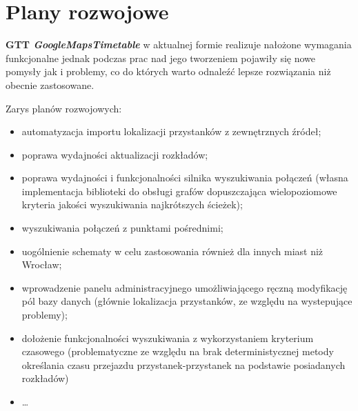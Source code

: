 \documentclass[a4paper,12pt]{article}
\begin{document}
\section{Plany rozwojowe} 

 \textbf{GTT \emph{GoogleMapsTimetable}} w aktualnej formie realizuje nałożone
 wymagania funkcjonalne jednak podczas prac nad jego tworzeniem pojawiły się
 nowe pomysły jak i problemy, co do których warto odnaleźć lepsze rozwiązania
 niż obecnie zastosowane.
 
 Zarys planów rozwojowych:
 
 \begin{itemize}
   \item automatyzacja importu lokalizacji przystanków z zewnętrznych źródeł;
   \item poprawa wydajności aktualizacji rozkładów;
   \item poprawa wydajności i funkcjonalności silnika wyszukiwania połączeń
   (własna implementacja biblioteki do obsługi grafów dopuszczająca
   wielopoziomowe kryteria jakości wyszukiwania najkrótszych ścieżek);
   \item wyszukiwania połączeń z punktami pośrednimi;
   \item uogólnienie schematy w celu zastosowania również dla innych miast niż
   Wrocław;
   \item wprowadzenie panelu administracyjnego umożliwiającego ręczną
   modyfikację pól bazy danych (głównie lokalizacja przystanków, ze względu na
   wystepujące problemy);
   \item dołożenie funkcjonalności wyszukiwania z wykorzystaniem
   kryterium czasowego (problematyczne ze względu na brak deterministycznej
   metody określania czasu przejazdu przystanek-przystanek na podstawie posiadanych rozkładów)
   \item \ldots
 \end{itemize}
\end{document}

